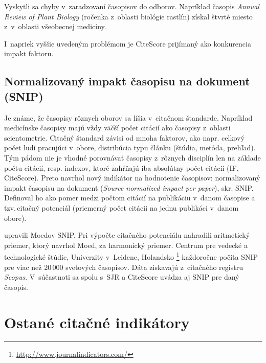 Vyskytli sa chyby v~zaradzovaní časopisov do odborov. Napríklad časopis \emph{Annual
Review of Plant Biology} (ročenka z~oblasti biológie rastlín) získal štvrté miesto
z~v~oblasti všeobecnej medicíny.

I~napriek vyššie uvedeným problémom je CiteScore prijímaný ako konkurencia impakt faktoru.

\subsection{Normalizovaný impakt časopisu na dokument (SNIP)}
\label{sec:snip}

Je známe, že časopisy rôznych oborov sa líšia v~citačnom štandarde.  Napríklad
medicínske časopisy majú vždy väčší počet citácií ako časopisy z~oblasti
scientometrie. Citačný štandard závisí od mnoha faktorov, ako napr.  celkový
počet ludí pracujúci v~obore, distribúcia typu článku (štúdia, metóda,
prehľad).  Tým pádom nie je vhodné porovnávať časopisy z~rôznych disciplín len
na základe počtu citácií, resp. indexov, ktoré zahŕňajú iba absolútny počet
citácií (IF, CiteScore).  Preto \citet{Moed2010} navrhol nový indikátor na
hodnotenie časopisov: normalizovaný impakt časopisu na dokument (\emph{Source
normalized impact per paper}), skr. SNIP. Definoval ho ako pomer medzi počtom
citácií na publikáciu v~danom časopise a tzv.\,citačný potenciál (priemerný
počet citácií na jednu publikáci v~danom obore).

\citet{Waltman2013} upravili Moedov SNIP. Pri výpočte citačného potenciálu
nahradili aritmetický priemer, ktorý navrhol Moed, za harmonický priemer.
Centrum pre vedecké a technologické štúdie, Univerzity v~Leidene, Holandsko
\footnote{\url{http://www.journalindicators.com/}} každoročne počíta SNIP pre
viac než 20\,000 svetových časopisov.  Dáta ziskavajú z~citačného registru
\emph{Scopus}. V~súčastnoti sa spolu s~SJR a CiteScore uvádza aj SNIP pre daný
časopis.

\section{Ostané citačné indikátory}

